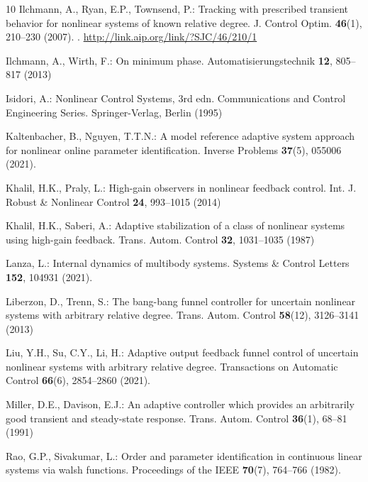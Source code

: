 \documentclass[ envcountsect, envcountsame]{svjour3}
\begin{document}
\begin{thebibliography}{10}
Ilchmann, A., Ryan, E.P., Townsend, P.: Tracking with prescribed transient
  behavior for nonlinear systems of known relative degree.
 J. Control Optim. \textbf{46}(1), 210--230 (2007).
\newblock {}.
\newblock \urlprefix\url{http://link.aip.org/link/?SJC/46/210/1}

Ilchmann, A., Wirth, F.: On minimum phase.
\newblock Automatisierungstechnik \textbf{12}, 805--817 (2013)

Isidori, A.: Nonlinear Control Systems, 3rd edn.
\newblock Communications and Control Engineering Series. Springer-Verlag,
  Berlin (1995)

Kaltenbacher, B., Nguyen, T.T.N.: A model reference adaptive system approach
  for nonlinear online parameter identification.
\newblock Inverse Problems \textbf{37}(5), 055006 (2021).
\newblock {}

Khalil, H.K., Praly, L.: High-gain observers in nonlinear feedback control.
\newblock Int. J. Robust \& Nonlinear Control \textbf{24}, 993--1015 (2014)

Khalil, H.K., Saberi, A.: Adaptive stabilization of a class of nonlinear
  systems using high-gain feedback.
 Trans. Autom. Control \textbf{32}, 1031--1035 (1987)

Lanza, L.: Internal dynamics of multibody systems.
\newblock Systems {\&} Control Letters \textbf{152}, 104931 (2021).
\newblock {}

Liberzon, D., Trenn, S.: The bang-bang funnel controller for uncertain
  nonlinear systems with arbitrary relative degree.
 Trans. Autom. Control \textbf{58}(12), 3126--3141 (2013)

Liu, Y.H., Su, C.Y., Li, H.: Adaptive output feedback funnel control of
  uncertain nonlinear systems with arbitrary relative degree.
 Transactions on Automatic Control \textbf{66}(6), 2854--2860
  (2021).
\newblock {}


Miller, D.E., Davison, E.J.: An adaptive controller which provides an
  arbitrarily good transient and steady-state response.
 Trans. Autom. Control \textbf{36}(1), 68--81 (1991)


Rao, G.P., Sivakumar, L.: Order and parameter identification in continuous
  linear systems via walsh functions.
\newblock Proceedings of the {IEEE} \textbf{70}(7), 764--766 (1982).
\newblock {}


\end{thebibliography}
\end{document}
